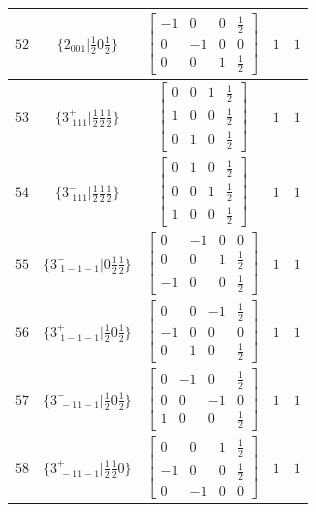 \documentclass[fleqn,8pt]{jsarticle}
\begin{document}
\begin{longtable}{ccccc}
$ 52 $ & $ \{2{}_{001}|\frac{1}{2} 0 \frac{1}{2}\} $ & $ \begin{bmatrix} -1 & 0 & 0 & \frac{1}{2} \\ 0 & -1 & 0 & 0 \\ 0 & 0 & 1 & \frac{1}{2} \end{bmatrix} $ & $ 1 $ & $ 1 $ \\ \hline
$ 53 $ & $ \{3^{+}_{\,\,111}|\frac{1}{2} \frac{1}{2} \frac{1}{2}\} $ & $ \begin{bmatrix} 0 & 0 & 1 & \frac{1}{2} \\ 1 & 0 & 0 & \frac{1}{2} \\ 0 & 1 & 0 & \frac{1}{2} \end{bmatrix} $ & $ 1 $ & $ 1 $ \\ \hline
$ 54 $ & $ \{3^{-}_{\,\,111}|\frac{1}{2} \frac{1}{2} \frac{1}{2}\} $ & $ \begin{bmatrix} 0 & 1 & 0 & \frac{1}{2} \\ 0 & 0 & 1 & \frac{1}{2} \\ 1 & 0 & 0 & \frac{1}{2} \end{bmatrix} $ & $ 1 $ & $ 1 $ \\ \hline
$ 55 $ & $ \{3^{-}_{\,\,1-1-1}|0 \frac{1}{2} \frac{1}{2}\} $ & $ \begin{bmatrix} 0 & -1 & 0 & 0 \\ 0 & 0 & 1 & \frac{1}{2} \\ -1 & 0 & 0 & \frac{1}{2} \end{bmatrix} $ & $ 1 $ & $ 1 $ \\ \hline
$ 56 $ & $ \{3^{+}_{\,\,1-1-1}|\frac{1}{2} 0 \frac{1}{2}\} $ & $ \begin{bmatrix} 0 & 0 & -1 & \frac{1}{2} \\ -1 & 0 & 0 & 0 \\ 0 & 1 & 0 & \frac{1}{2} \end{bmatrix} $ & $ 1 $ & $ 1 $ \\ \hline
$ 57 $ & $ \{3^{-}_{\,\,-11-1}|\frac{1}{2} 0 \frac{1}{2}\} $ & $ \begin{bmatrix} 0 & -1 & 0 & \frac{1}{2} \\ 0 & 0 & -1 & 0 \\ 1 & 0 & 0 & \frac{1}{2} \end{bmatrix} $ & $ 1 $ & $ 1 $ \\ \hline
$ 58 $ & $ \{3^{+}_{\,\,-11-1}|\frac{1}{2} \frac{1}{2} 0\} $ & $ \begin{bmatrix} 0 & 0 & 1 & \frac{1}{2} \\ -1 & 0 & 0 & \frac{1}{2} \\ 0 & -1 & 0 & 0 \end{bmatrix} $ & $ 1 $ & $ 1 $ \\ \hline

\end{longtable}
\end{document}

